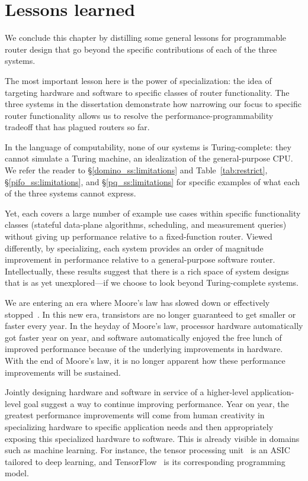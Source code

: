 \section{Lessons learned} We conclude this chapter by distilling some general
lessons for programmable router design that go beyond the specific
contributions of each of the three systems.

 The most important lesson here  is the
power of specialization: the idea of targeting hardware and software to
specific classes of router functionality.  The three systems in the
dissertation demonstrate how narrowing our focus to specific router
functionality allows us to resolve the performance-programmability tradeoff
that has plagued routers so far.

In the language of computability, none of our systems is Turing-complete: they
cannot simulate a Turing machine, an idealization of the general-purpose CPU.
We refer the reader to \S\ref{domino_ss:limitations} and
Table~\ref{tab:restrict}, \S\ref{pifo_ss:limitations}, and
\S\ref{pq_ss:limitations} for specific examples of what each of the three
systems cannot express.

Yet, each covers a large number of example use cases within specific
functionality classes (stateful data-plane algorithms, scheduling, and
measurement queries) without giving up performance relative to a fixed-function
router. Viewed differently, by specializing, each system provides an order of
magnitude improvement in performance relative to a general-purpose software
router. Intellectually, these results suggest that there is a rich space of
system designs that is as yet unexplored---if we choose to look beyond
Turing-complete systems. 

 We are entering an era where
Moore's law has slowed down or effectively stopped~\cite{dark_silicon,
four_horsemen}.  In this new era, transistors are no longer guaranteed to get
smaller or faster every year. In the heyday of Moore's law, processor hardware
automatically got faster year on year, and software automatically enjoyed the
free lunch of improved performance because of the underlying improvements in
hardware. With the end of Moore's law, it is no longer apparent how these
performance improvements will be sustained.

Jointly designing hardware and software in service of a higher-level
application-level goal suggest a way to continue improving performance. Year on
year, the greatest performance improvements will come from human creativity in
specializing hardware to specific application needs and then appropriately
exposing this specialized hardware to software. This is already visible in
domains such as machine learning. For instance, the tensor processing
unit~\cite{tpu} is an ASIC tailored to deep learning, and
TensorFlow~\cite{tensorflow} is its corresponding programming model.

